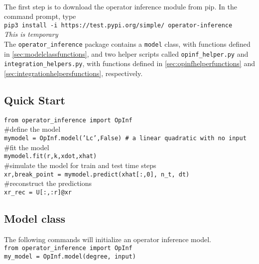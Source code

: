 \documentclass[11pt]{article} %
\newcommand{\code}[1]{\colorbox{light-gray}{\texttt{#1}}}
\begin{document}
\noindent\hrulefill\\

\noindent The first step is to download the operator inference module from pip. In the command prompt, type\\
\code{pip3 install -i https://test.pypi.org/simple/ operator-inference} \\
\textit{This is temporary}\\






\noindent The \code{operator\_inference} package contains a \code{model} class, with functions defined in \ref{sec:modelclassfunctions}, and two helper scripts called \code{opinf\_helper.py} and \code{integration\_helpers.py}, with functions defined in \ref{sec:opinfhelperfunctions} and \ref{sec:integrationhelpersfunctions}, respectively. \\
\subsection{Quick Start}
\code{from operator\_inference import OpInf}\\

\noindent \#define the model \\
\code{mymodel = OpInf.model('Lc',False) \# a linear quadratic with no input}\\


\noindent \#fit the model\\
\code{mymodel.fit(r,k,xdot,xhat)}\\

\noindent \#simulate the model for train and test time steps\\
\code{xr,break\_point = mymodel.predict(xhat[:,0], n\_t, dt)}\\

\noindent \#reconstruct the predictions\\
\code{xr\_rec = U[:,:r]@xr}

\subsection{ Model class}

The following commands will initialize an operator inference model. \\
\indent \code{from operator\_inference import OpInf}\\
\indent \code{my\_model = OpInf.model(degree, input)}\\
\end{document}
